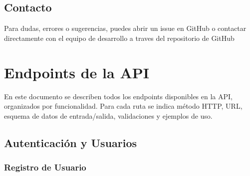 \documentclass[a4paper,11pt,spanish]{sphinxmanual}
\begin{document}
\section{Contacto}
\label{\detokenize{introduccion:contacto}}
\sphinxAtStartPar
Para dudas, errores o sugerencias, puedes abrir un issue en GitHub o contactar directamente con el equipo de desarrollo a traves del repositorio de GitHub

\sphinxstepscope


\chapter{Endpoints de la API}
\label{\detokenize{endpoints:endpoints-de-la-api}}\label{\detokenize{endpoints::doc}}
\sphinxAtStartPar
En este documento se describen todos los endpoints disponibles en la API, organizados por funcionalidad. Para cada ruta se indica método HTTP, URL, esquema de datos de entrada/salida, validaciones y ejemplos de uso.


\section{Autenticación y Usuarios}
\label{\detokenize{endpoints:autenticacion-y-usuarios}}

\subsection{Registro de Usuario}
\label{\detokenize{endpoints:registro-de-usuario}}
\end{document}

